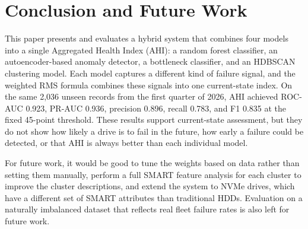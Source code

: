 \documentclass[sigconf,natbib=false]{acmart}
\begin{document}
\section{Conclusion and Future Work}
\label{sec:conclusion}

This paper presents and evaluates a hybrid system that combines four models into a single Aggregated Health Index (AHI): a random forest classifier, an autoencoder-based anomaly detector, a bottleneck classifier, and an HDBSCAN clustering model. Each model captures a different kind of failure signal, and the weighted RMS formula combines these signals into one current-state index. On the same 2,036 unseen records from the first quarter of 2026, AHI achieved ROC-AUC 0.923, PR-AUC 0.936, precision 0.896, recall 0.783, and F1 0.835 at the fixed 45-point threshold. These results support current-state assessment, but they do not show how likely a drive is to fail in the future, how early a failure could be detected, or that AHI is always better than each individual model.

For future work, it would be good to tune the weights based on data rather than setting them manually, perform a full SMART feature analysis for each cluster to improve the cluster descriptions, and extend the system to NVMe drives, which have a different set of SMART attributes than traditional HDDs. Evaluation on a naturally imbalanced dataset that reflects real fleet failure rates is also left for future work.

\printbibliography
\end{document}

